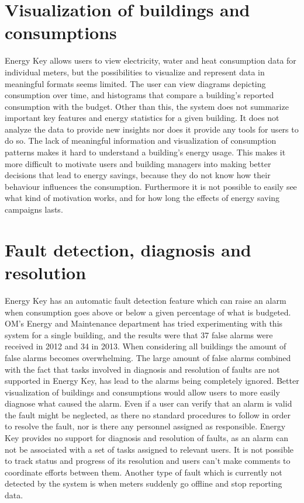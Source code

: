 \section*{Visualization of buildings and consumptions}
Energy Key allows users to view electricity, water and heat consumption data for individual meters, but the possibilities to visualize and represent data in meaningful formats seems limited. The user can view diagrams depicting consumption over time, and histograms that compare a building’s reported consumption with the budget. Other than this, the system does not summarize important key features and energy statistics for a given building. It does not analyze the data to provide new insights nor does it provide any tools for users to do so. The lack of meaningful information and visualization of consumption patterns makes it hard to understand a building’s energy usage. This makes it more difficult to motivate users and building managers into making better decisions that lead to energy savings, because they do not know how their behaviour influences the consumption. Furthermore it is not possible to easily see what kind of motivation works, and for how long the effects of energy saving campaigns lasts.
\section*{Fault detection, diagnosis and resolution}
 Energy Key has an automatic fault detection feature which can raise an alarm when consumption goes above or below a given percentage of what is budgeted. OM’s Energy and Maintenance department has tried experimenting with this system for a single building, and the results were that 37 false alarms were received in 2012 and 34 in 2013. When considering all buildings the amount of false alarms becomes overwhelming. The large amount of false alarms combined with the fact that tasks involved in diagnosis and resolution of faults are not supported in Energy Key, has lead to the alarms being completely ignored. Better visualization of buildings and consumptions would allow users to more easily diagnose what caused the alarm. Even if a user can verify that an alarm is valid the fault might be neglected, as there no standard procedures to follow in order to resolve the fault, nor is there any personnel assigned as responsible. Energy Key provides no support for diagnosis and resolution of faults, as an alarm can not be associated with a set of tasks assigned to relevant users. It is not possible to track status and progress of its resolution and users can’t make comments to coordinate efforts between them. Another type of fault which is currently not detected by the system is when meters suddenly go offline and stop reporting data.
